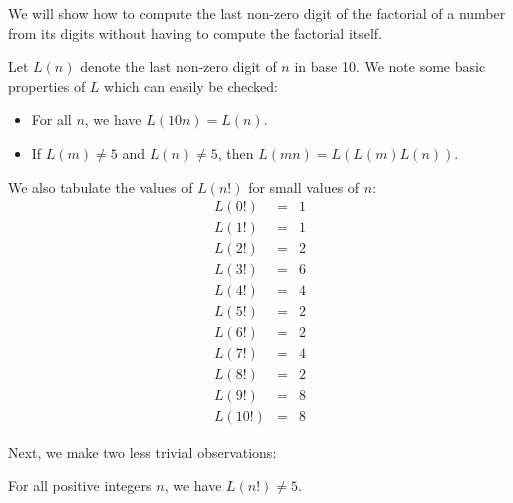 \documentclass[12pt]{article}
\begin{document}
We will show how to compute the last non-zero
digit of the factorial of a number from its
digits without having to compute the factorial itself.

Let $L(n)$ denote the last non-zero digit of $n$ in base 10.
We note some basic properties of $L$ which can easily
be checked:
\begin{itemize}
\item For all $n$, we have $L(10n) = L(n)$.
\item If $L(m) \neq 5$ and $L(n) \neq 5$, then $L(mn) = L (L(m) L(n))$.
\end{itemize}

We also tabulate the values of $L(n!)$ for small values of $n$:
\begin{eqnarray*}
L(0!) &=& 1 \\
L(1!) &=& 1 \\
L(2!) &=& 2 \\
L(3!) &=& 6 \\
L(4!) &=& 4 \\
L(5!) &=& 2 \\
L(6!) &=& 2 \\
L(7!) &=& 4 \\
L(8!) &=& 2 \\
L(9!) &=& 8 \\
L(10!) &=& 8 
\end{eqnarray*}

Next, we make two less trivial observations:

\begin{theorem}
For all positive integers $n$, we have $L(n!) \neq 5$.
\end{theorem}
\end{document}
